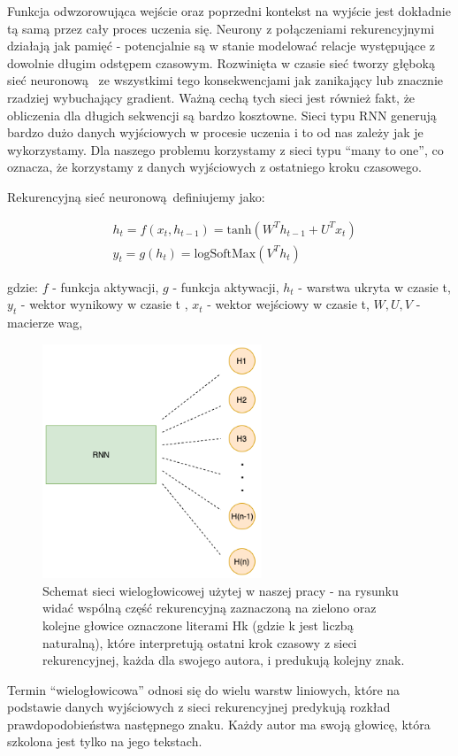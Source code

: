 Funkcja odwzorowująca wejście oraz poprzedni kontekst na wyjście jest dokładnie tą samą przez cały proces
uczenia się. Neurony z połączeniami rekurencyjnymi działają jak pamięć - potencjalnie są w stanie modelować relacje
występujące z dowolnie długim odstępem czasowym. 
Rozwinięta w czasie sieć tworzy głęboką sieć neuronową 
ze wszystkimi tego konsekwencjami jak zanikający lub znacznie rzadziej wybuchający gradient. 
Ważną cechą tych sieci jest również fakt, że obliczenia dla długich sekwencji są bardzo kosztowne.
Sieci typu RNN generują bardzo dużo danych wyjściowych w procesie uczenia i to od nas zależy jak je 
wykorzystamy. Dla naszego problemu korzystamy z sieci typu ``many to one'', co oznacza, że korzystamy
z danych wyjściowych z ostatniego kroku czasowego.

\newpage
Rekurencyjną sieć neuronową definiujemy jako:

\begin{align}
  &h_t = f(x_t, h_{t-1}) = \text{tanh}(W^Th_{t-1} + U^Tx_t) \\ 
  &y_t = g(h_t) = \text{logSoftMax}(V^Th_t)
\end{align}

gdzie: \newline
$f$ - funkcja aktywacji, \newline
$g$ - funkcja aktywacji, \newline
$h_t$ - warstwa ukryta w czasie t, \newline
$y_t$ - wektor wynikowy w czasie t , \newline
$x_t$ - wektor wejściowy w czasie t, \newline
$W, U, V$ - macierze wag, \newline


\begin{figure}[H]
\centering
\includegraphics[height=7cm]{./images/multiheaded-rnn.png}
\caption{Schemat sieci wielogłowicowej użytej w naszej pracy - na rysunku widać wspólną część rekurencyjną zaznaczoną na zielono
oraz kolejne głowice oznaczone literami Hk (gdzie k jest liczbą naturalną), które interpretują ostatni krok czasowy z sieci rekurencyjnej, każda
dla swojego autora, i predukują kolejny znak.}
\label{fig:test5}
\end{figure}


Termin ``wielogłowicowa'' odnosi się do wielu warstw liniowych, które na podstawie danych wyjściowych z 
sieci rekurencyjnej predykują rozkład prawdopodobieństwa następnego znaku. Każdy autor ma swoją głowicę, która 
szkolona jest tylko na jego tekstach.